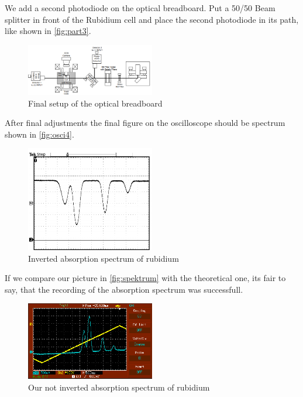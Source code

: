 We add a second photodiode on the optical breadboard.
Put a 50/50 Beam splitter in front of the Rubidium cell and place the second photodiode in its path, like shown in \autoref{fig:part3}.
\begin{figure}
    \centering
    \includegraphics[width=0.5\textwidth]{images/part3.png}
    \caption{Final setup of the optical breadboard \cite{V60}}
    \label{fig:part3}
\end{figure}
After final adjustments the final figure on the oscilloscope should be spectrum shown in \autoref{fig:osci4}.
\begin{figure}
    \centering
    \includegraphics[width=0.5\textwidth]{images/oszi2.png}
    \caption{Inverted absorption spectrum of rubidium \cite{V60}}
    \label{fig:osci4}
\end{figure}
If we compare our picture in \autoref{fig:spektrum} with the theoretical one, its fair to say, that the recording of the absorption spectrum was successfull.
\begin{figure}
    \centering
    \includegraphics[width=0.5\textwidth]{images/spektrum.png}
    \caption{Our not inverted absorption spectrum of rubidium}
    \label{fig:spektrum}
\end{figure}